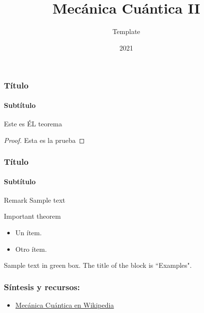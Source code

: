 \documentclass{beamer}
\title{Mecánica Cuántica II}
\subtitle{Template}
\date{2021}
\begin{document}
\frame{\titlepage}

\begin{frame}
\frametitle{Título}
\framesubtitle{Subtítulo}

\begin{theorem}
    Este es ÉL teorema
\end{theorem}

\begin{proof}
    Esta es la prueba
\end{proof}

\end{frame}

\begin{frame}
    \frametitle{Título}
    \framesubtitle{Subtítulo}

\begin{block}{Remark}
    Sample text
    \end{block}
    
    \begin{alertblock}{Important theorem}
        \begin{itemize}
            \item Un ítem.
            \item Otro ítem.
        \end{itemize}
    \end{alertblock}
    
    \begin{examples}
    Sample text in green box. The title {\color{cyan} of the block} is ``Examples".
    \end{examples}
\end{frame}


\begin{frame}
\frametitle{Síntesis y recursos:}

\begin{itemize}
\item \href{https://en.wikipedia.org/wiki/Quantum_mechanics}{Mecánica Cuántica en Wikipedia}
\end{itemize}
\end{frame}
\end{document}

